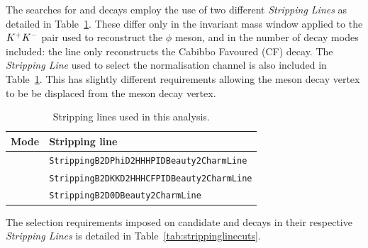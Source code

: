The searches for \decay{\Bp}{\Dsp\phiz} and \decay{\Bp}{\Dsp\Kp\Km} decays employ the use of two different \emph{Stripping Lines} as detailed in Table~\ref{tab:strippinglines}. These differ only in the invariant mass window applied to the ${{K}^+}{{K}^-}$ pair used to reconstruct the $\phi$ meson, and in the number of \Dsp decay modes included: the \decay{\Bp}{\Dsp\Kp\Km} line only reconstructs the Cabibbo Favoured (CF) \decay{\Dsp}{\Kp\Km\pip} decay. The \emph{Stripping Line} used to select the normalisation channel \decay{\Bp}{\Dsp\Dzb} is also included in Table~\ref{tab:strippinglines}. This has slightly different requirements allowing the \Dzb meson decay vertex to be be displaced from the \Bp meson decay vertex.


\begin{table}[t]
\caption{Stripping lines used in this analysis.}
\begin{center}
\begin{tabular}{l l}

\hline
Mode & Stripping line \\ 
\hline
\decay{\Bp}{\Dsp\phiz}        & \texttt{StrippingB2DPhiD2HHHPIDBeauty2CharmLine}    \\
\decay{\Bp}{\Dsp\Kp\Km}       & \texttt{StrippingB2DKKD2HHHCFPIDBeauty2CharmLine}   \\
\decay{\Bp}{\Dsp\Dzb}         & \texttt{StrippingB2D0DBeauty2CharmLine}             \\
\hline
\end{tabular}
\end{center}
\label{tab:strippinglines}
\end{table}


The selection requirements imposed on candidate \decay{\Bp}{\Dsp\phiz} and \decay{\Bp}{\Dsp\Kp\Km} decays in their respective \emph{Stripping Lines} is detailed in Table~\ref{tab:strippinglinecuts}. 


